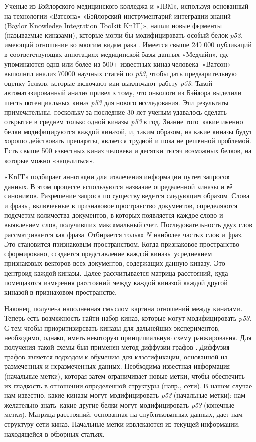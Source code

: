 Ученые из Бэйлорского медицинского колледжа и «IBM», используя основанный на технологии «Ватсона» «Бэйлорский 
инструментарий интеграции знаний (Baylor Knowledge Integration Toolkit KnIT)», нашли новые ферменты 
(называемые киназами), которые могли бы модифицировать особый белок \textit{p53}, имеющий отношение ко многим видам 
рака \cite{spangler2014automated}. Имеется свыше 240 000 публикаций в соответствующих аннотациях медицинской базы 
данных «Медлайн», где упоминаются одна или более из 500+ известных киназ человека. «Ватсон» выполнил анализ 70000 
научных статей по \textit{p53}, чтобы дать предварительную оценку белков, которые включают или выключают работу 
\textit{p53}. Такой автоматизированный анализ привел к тому, что онкологи из Бэйлора выделили шесть потенциальных 
киназ \textit{p53} для нового исследования. Эти результаты примечательны, поскольку за последние 30 лет ученым 
удавалось сделать открытие в среднем только одной киназы \textit{p53} в год. Знание того, какие именно белки 
модифицируются каждой киназой, и, таким образом, на какие киназы будут хорошо действовать препараты, является трудной и 
пока не решенной проблемой. Есть свыше 500 известных киназ человека и десятки тысяч возможных белков, на которые 
можно «нацелиться». 

«KnIT» подбирает аннотации для извлечения информации путем запросов данных. В этом процессе используются название 
определенной киназы и её синонимов. Разрешение запроса по существу ведется следующим образом. Слова и фразы, включенные 
в признаковое пространство документов, определяются подсчетом количества документов, в которых появляется каждое слово 
и выявлением слов, получивших максимальный счет. Последовательность двух слов рассматривается как фраза. Отбирается 
только $N$ наиболее частых слов и фраз. Это становится признаковым пространством. Когда признаковое пространство 
сформировано, создается представление каждой киназы усреднением признаковых векторов всех документов, содержащих 
данную киназу. Это центроид каждой киназы. Далее рассчитывается матрица расстояний, куда помещаются измерения 
расстояний между каждой киназой каждой другой киназой в признаковом пространстве.

Наконец, получена наполненная смыслом картина отношений между киназами. Теперь есть возможность найти набор киназ, 
которые могут модифицировать \textit{p53}. С тем чтобы приоритизировать киназы для дальнейших экспериментов, 
необходимо, однако, иметь некоторую принципиальную схему ранжирования. Для получения такой схемы был применен метод 
диффузии графов \cite{zhou2003learning}. Диффузия графов является подходом к обучению для классификации, основанной 
на размеченных и неразмеченных данных. Необходима известная информация (начальные метки), которая затем ограничивает 
новые метки, чтобы обеспечить их гладкость в отношении определенной структуры (напр., сети). В нашем случае нам 
известно, какие киназы могут модифицировать \textit{p53} (начальные метки); нам желательно знать, какие другие белки 
могут модифицировать \textit{p53} (конечные метки). Матрица расстояний, основанная на опубликованных данных, дает нам 
структуру сети киназ. Начальные метки извлекаются из текущей информации, находящейся в обзорных статьях.

